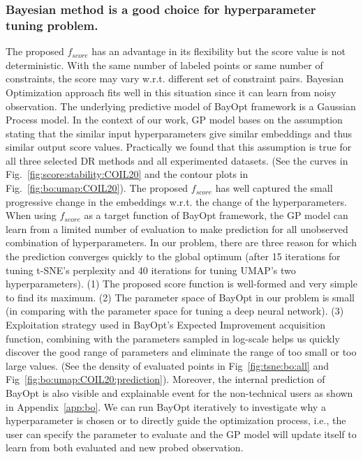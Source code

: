 \subsubsection*{Bayesian method is a good choice for hyperparameter tuning problem.}
The proposed $f_{score}$ has an advantage in its flexibility but the score value is not deterministic.
With the same number of labeled points or same number of constraints, the score may vary w.r.t. different set of constraint pairs.
Bayesian Optimization approach fits well in this situation since it can learn from noisy observation.
The underlying predictive model of BayOpt framework is a Gaussian Process model.
In the context of our work, GP model bases on the assumption stating that the similar input hyperparameters give similar embeddings and thus similar output score values.
Practically we found that this assumption is true for all three selected DR methods and all experimented datasets. (See the curves in Fig.~\ref{fig:score:stability:COIL20} and the contour plots in Fig.~\ref{fig:bo:umap:COIL20}).
The proposed $f_{score}$ has well captured the small progressive change in the embeddings w.r.t. the change of the hyperparameters.
When using $f_{score}$ as a target function of BayOpt framework, the GP model can learn from a limited number of evaluation to make prediction for all unobserved combination of hyperparameters.
In our problem, there are three reason for which the prediction converges quickly to the global optimum (after 15 iterations for tuning t-SNE's perplexity and 40 iterations for tuning UMAP's two hyperparameters).
(1) The proposed score function is well-formed and very simple to find its maximum.
(2) The parameter space of BayOpt in our problem is small (in comparing with the parameter space for tuning a deep neural network).
(3) Exploitation strategy used in BayOpt's Expected Improvement acquisition function, combining with the parameters sampled in log-scale helps us quickly discover the good range of parameters and eliminate the range of too small or too large values. (See the density of evaluated points in Fig~\ref{fig:tsne:bo:all} and Fig~\ref{fig:bo:umap:COIL20:prediction}).
Moreover, the internal prediction of BayOpt is also visible and explainable event for the non-technical users as shown in Appendix~\ref{app:bo}.
We can run BayOpt iteratively to investigate why a hyperparameter is chosen or to directly guide the optimization process, i.e., the user can specify the parameter to evaluate and the GP model will update itself to learn from both evaluated and new probed observation.


